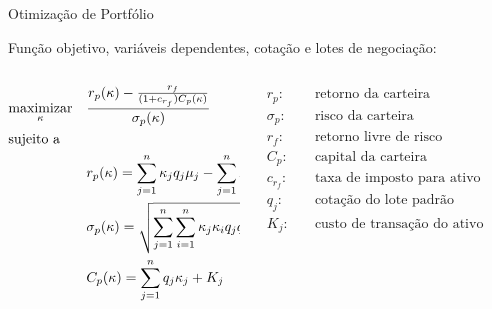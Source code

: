     \begin{frame}{Otimização de Portfólio}

        Função objetivo, variáveis dependentes, cotação e lotes de negociação:

        \begin{columns}
            \begin{column}{0.5\textwidth}

                \begin{subequations}
                    \label{eq:otimizacao_1}
                    \begin{align}
                        & \underset{\kappa}{\text{maximizar}}
                        & & \frac{r_{p}(\kappa) - \frac{r_{f}}{(1+c_{r_{f}}) C_{p}(\kappa)}}{\sigma_{p}(\kappa)} \\
                        & \text{sujeito a} \notag \\
                        & & & r_{p}(\kappa) = \sum_{j=1}^{n} \kappa_{j} q_{j} \mu_{j} -  \sum_{j=1}^{n} K_{j} \\
                        & & & \sigma_{p}(\kappa) = \sqrt{\sum_{j=1}^{n} \sum_{i=1}^{n} \kappa_{j} \kappa_{i} q_{j} q_{i} \sigma_{j} \sigma_{i} \rho_{ij}} \\
                        & & & C_{p}(\kappa) = \sum_{j=1}^{n} q_{j}\kappa_{j} + K_{j}
                    \end{align}
                \end{subequations}
            \end{column}

            \begin{column}{0.5\textwidth}

                \begin{equation*}
                    \begin{aligned}
                        r_{p} : \quad & \text{retorno da carteira} \\
                        \sigma_{p} : \quad & \text{risco da carteira} \\
                        r_{f} : \quad & \text{retorno livre de risco} \\
                        C_{p} : \quad & \text{capital da carteira} \\
                        c_{r_{f}} : \quad & \text{taxa de imposto para ativo livre de risco} \\
                        q_{j} : \quad & \text{cotação do lote padrão} \\
                        K_{j} : \quad & \text{custo de transação do ativo}
                    \end{aligned}
                \end{equation*}

            \end{column}
        \end{columns}




    \end{frame}

